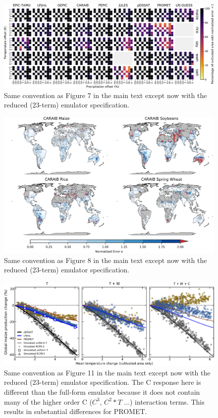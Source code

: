 \documentclass[12pt]{article}
\begin{document}
\begin{figure}[h!]
  \centering
  \includegraphics[width=15.5cm]{reduced_error_grid.png}
  \caption{
  Same convention as Figure 7 in the main text except now with the reduced (23-term) emulator specification.
  }
  \label{fig:reducedgrid}
\end{figure}

\begin{figure}[h!]
  \centering
  \includegraphics[width=15.5cm]{reduced_CARAIB_spatial_error.png}
  \caption{
  Same convention as Figure 8 in the main text except now with the reduced (23-term) emulator specification.
  }
  \label{fig:reducedcaraib}
\end{figure}

\begin{figure}[h!]
  \centering
  \includegraphics[width = 16.3cm]{reduced_global_em_maize.png}
  \caption{
  Same convention as Figure 11 in the main text except now with the reduced (23-term) emulator specification. The C response here is different than the full-form emulator because it does not contain many of the higher order C ($C^{3}$, $C^{2} * T$ ...) interaction terms. This results in substantial differences for PROMET. 
  }
\end{figure}
\end{document}
